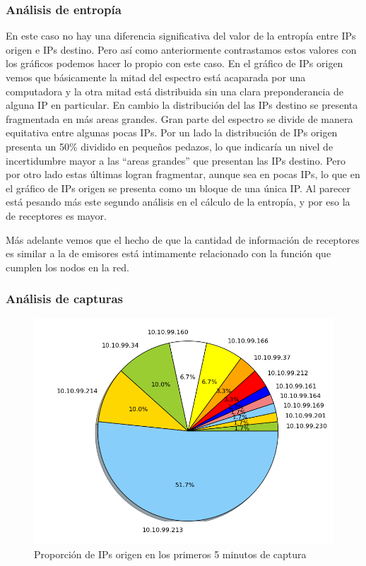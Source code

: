 \subsubsection{Análisis de entropía}
En este caso no hay una diferencia significativa del valor de la entropía entre IPs origen e IPs destino. Pero así como anteriormente contrastamos estos valores con los gráficos podemos hacer lo propio con este caso. En el gráfico de IPs origen vemos que básicamente la mitad del espectro está acaparada por una computadora y la otra mitad está distribuida sin una clara preponderancia de alguna IP en particular. En cambio la distribución del las IPs destino se presenta fragmentada en más areas grandes. Gran parte del espectro se divide de manera equitativa entre algunas pocas IPs. 
Por un lado la distribución de IPs origen presenta un 50\% dividido en pequeños pedazos, lo que indicaría un nivel de incertidumbre mayor a las ``areas grandes'' que presentan las IPs destino. Pero por otro lado estas últimas logran fragmentar, aunque sea en pocas IPs, lo que en el gráfico de IPs origen se presenta como un bloque de una única IP.
Al parecer está pesando más este segundo análisis en el cálculo de la entropía, y por eso la de receptores es mayor.

Más adelante vemos que el hecho de que la cantidad de información de receptores es similar a la de emisores está intimamente relacionado con la función que cumplen los nodos en la red.

\subsubsection{Análisis de capturas}
\begin{figure}[!h]
  \includegraphics[width=\textwidth,keepaspectratio]{graph/emisores_somodi.png}
  \caption{Proporción de IPs origen en los primeros 5 minutos de captura}
  \label{fig:torta-emisor-inv}
\end{figure}

